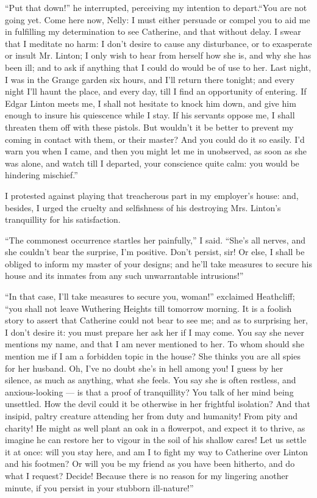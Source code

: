 \par “Put that down!” he interrupted, perceiving my intention to depart.“You are not going yet. Come here now, Nelly: I must either persuade or compel you to aid me in fulfilling my determination to see Catherine, and that without delay. I swear that I meditate no harm: I don't desire to cause any disturbance, or to exasperate or insult Mr. Linton; I only wish to hear from herself how she is, and why she has been ill; and to ask if anything that I could do would be of use to her. Last night, I was in the Grange garden six hours, and I'll return there tonight; and every night I'll haunt the place, and every day, till I find an opportunity of entering. If Edgar Linton meets me, I shall not hesitate to knock him down, and give him enough to insure his quiescence while I stay. If his servants oppose me, I shall threaten them off with these pistols. But wouldn't it be better to prevent my coming in contact with them, or their master? And you could do it so easily. I'd warn you when I came, and then you might let me in unobserved, as soon as she was alone, and watch till I departed, your conscience quite calm: you would be hindering mischief.”
\par I protested against playing that treacherous part in my employer's house: and, besides, I urged the cruelty and selfishness of his destroying Mrs. Linton's tranquillity for his satisfaction.
\par “The commonest occurrence startles her painfully,” I said. “She's all nerves, and she couldn't bear the surprise, I'm positive. Don't persist, sir! Or else, I shall be obliged to inform my master of your designs; and he'll take measures to secure his house and its inmates from any such unwarrantable intrusions!”
\par “In that case, I'll take measures to secure you, woman!” exclaimed Heathcliff; “you shall not leave Wuthering Heights till tomorrow morning. It is a foolish story to assert that Catherine could not bear to see me; and as to surprising her, I don't desire it: you must prepare her ask her if I may come. You say she never mentions my name, and that I am never mentioned to her. To whom should she mention me if I am a forbidden topic in the house? She thinks you are all spies for her husband. Oh, I've no doubt she's in hell among you! I guess by her silence, as much as anything, what she feels. You say she is often restless, and anxious-looking — is that a proof of tranquillity? You talk of her mind being unsettled. How the devil could it be otherwise in her frightful isolation? And that insipid, paltry creature attending her from duty and humanity! From pity and charity! He might as well plant an oak in a flowerpot, and expect it to thrive, as imagine he can restore her to vigour in the soil of his shallow cares! Let us settle it at once: will you stay here, and am I to fight my way to Catherine over Linton and his footmen? Or will you be my friend as you have been hitherto, and do what I request? Decide! Because there is no reason for my lingering another minute, if you persist in your stubborn ill-nature!”
